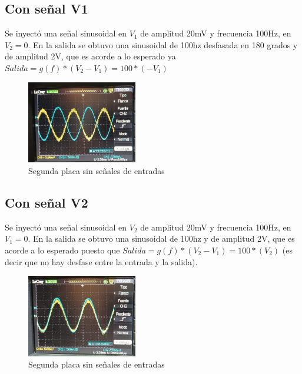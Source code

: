\documentclass[letterpaper, 10 pt, conference]{ieeeconf}  %
\begin{document}
\subsection{Con señal V1}
Se inyectó una señal sinusoidal en $V_{1}$ de amplitud 20mV y frecuencia 100Hz, en $V_{2}=0$. En la salida se obtuvo una sinusoidal de 100hz desfasada en 180 grados y de amplitud 2V, que es acorde a lo esperado ya $Salida=g(f)*( V_{2} - V_{1} )=100*(-V_{1})$
\begin{figure}[H]
  \centering
  \includegraphics[width=0.43\textwidth]{./Imagenes/v1_100hz.png}
  \caption{Segunda placa sin señales de entradas}
  \label{pic:100hz_v1}
\end{figure}

\subsection{Con señal V2}
Se inyectó una señal sinusoidal en $V_{2}$ de amplitud 20mV y frecuencia 100Hz, en $V_{1}=0$. En la salida se obtuvo una sinusoidal de 100hz y de amplitud 2V, que es acorde a lo esperado puesto que $Salida=g(f)*( V_{2} - V_{1} )=100*(V_{2})$ (es decir que no hay desfase entre la entrada y la salida).
\begin{figure}[H]
  \centering
  \includegraphics[width=0.43\textwidth]{./Imagenes/v2_100hz.png}
  \caption{Segunda placa sin señales de entradas}
  \label{pic:100hz_v2}
\end{figure}
\end{document}
